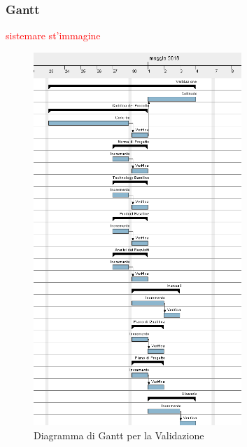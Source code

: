 \subsubsection{Gantt}
\textcolor{red}{sistemare st'immagine}
\begin{figure}[H]
	\centering 
	\includegraphics[width=0.7\textwidth]{images/Validazione.png}
	\caption{Diagramma di Gantt per la Validazione}
	\label{graficobello6} 
\end{figure}
